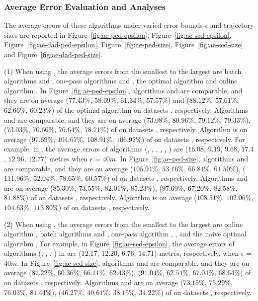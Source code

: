 \vspace{-0.5ex}
\subsubsection{Average Error Evaluation and Analyses}
The average errors of these algorithms under varied error bounds $\epsilon$ and trajectory sizes are reported in Figure~\ref{fig:ae-ped-epsilon}, Figure~\ref{fig:ae-sed-epsilon}, Figure~\ref{fig:ae-dad-ped-epsilon}, Figure~\ref{fig:ae-ped-size}, Figure~\ref{fig:ae-sed-size} and Figure~\ref{fig:ae-dad-ped-size}.


\sstab (1) When using \ped, the average errors from the smallest
to the largest are batch algorithms \tpa and \dpa, one-pass
algorithms \siped and \operb, the optimal algorithm \opt and online algorithm \bqsa.
%
In Figure~\ref{fig:ae-ped-epsilon}, algorithms \tpa and \dpa are comparable, and they are on average ($77.43\%$, $58.69\%$, $61.34\%$,
$57.57\%$) and ($88.12\%$, $57.61\%$, $62.66\%$, $60.23\%$) of the optimal algorithm \opt on datasets \dSets, respectively.
Algorithms \siped and \operb are comparable, and they are on average
($73.08\%$, $80.96\%$, $79.12\%$, $79.33\%$), ($73.03\%$, $70.60\%$, $76.64\%$, $78.71\%$) of \opt on datasets \dSets, respectively.
Algorithm \bqsa is on average ($97.69\%$, $104.67\%$, $108.91\%$, $106.92\%$) of \opt on datasets \dSets, respectively.
For example, in \mopsi, the average errors of algorithms
(\opt, \tpa, \dpa, \bqsa, \siped, \operb ) are ($16.08$, $9.19$, $9.68$, $17.4$, $12.96$, $12.77$)  metres when $\epsilon$ = $40m$.
%
In Figure~\ref{fig:ae-ped-size}, algorithms \tpa and \dpa are comparable, and they are on average
{($105.94\%$, $53.16\%$, $66.84\%$, $61.50\%$), ($111.96\%$, $52.04\%$, $78.65\%$, $60.57\%$)} of \opt on datasets \dSets, respectively.
Algorithms \siped and \operb are on average {($85.30\%$, $73.55\%$, $82.01\%$,
  $85.23\%$), ($97.69\%$, $67.20\%$, $82.58\%$, $81.88\%$)}
of \opt on datasets \dSets, respectively.
Algorithm \bqsa is  on average  {($108.51\%$, $102.06\%$, $104.63\%$, $113.80\%$)}
of \opt on datasets \dSets, respectively.


\sstab (2) When using \sed, the average errors from the smallest
to the largest are online algorithm \squishe, batch algorithms \tpa and \dpa,
one-pass algorithm \cised, , and the naive optimal algorithm \opt,
%
For example, in Figure~\ref{fig:ae-sed-epsilon}, the average errors of algorithms
(\tpa, \dpa, \squishe, \cised) in \mopsi are ($12.17$, $12.20$, $6.76$, $14.71$) metres, respectively, when $\epsilon$ = $40m$.
%
In Figure~\ref{fig:ae-sed-size}, algorithms \tpa and \dpa are comparable, and they are on average
{($87.22\%$, $60.36\%$, $66.11\%$, $62.43\%$), ($91.04\%$, $62.54\%$, $67.04\%$, $68.64\%$)} of \opt on datasets \dSets, respectively.
Algorithms \cised and \squishe are on average {($73.15\%$, $75.29\%$, $76.03\%$, $81.44\%$), ($46.27\%$, $40.61\%$, $38.15\%$, $34.22\%$)} of \opt on datasets \dSets, respectively.


